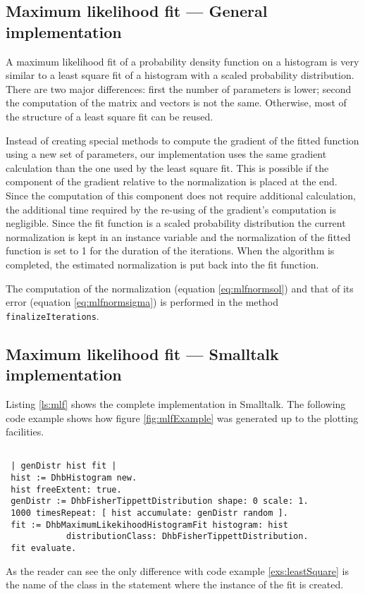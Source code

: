 \documentclass[twoside]{book}
\begin{document}
\subsection{Maximum likelihood fit --- General  implementation}
 A maximum likelihood fit
of a probability density function on a histogram is very similar
to a least square fit of a histogram with a scaled probability
distribution. There are two major differences: first the number of
parameters is lower; second the computation of the matrix and
vectors is not the same. Otherwise, most of the structure of a
least square fit can be reused.

Instead of creating special methods to compute the gradient of the
fitted function using a new set of parameters, our implementation
uses the same gradient calculation than the one used by the least
square fit. This is possible if the component of the gradient
relative to the normalization is placed at the end. Since the
computation of this component does not require additional
calculation, the additional time required by the re-using of the
gradient's computation is negligible. Since the fit function is a
scaled probability distribution the current normalization is kept
in an instance variable and the normalization of the fitted
function is set to 1 for the duration of the iterations. When the
algorithm is completed, the estimated normalization is put back
into the fit function.

The computation of the normalization (equation
\ref{eq:mlfnormsol}) and that of its error (equation
\ref{eq:mlfnormsigma}) is performed in the method {\tt
finalizeIterations}.

\subsection{Maximum likelihood fit --- Smalltalk  implementation}
\label{sec:smlfhist}Listing \ref{ls:mlf} shows the complete
implementation in Smalltalk. The following code example shows how
figure \ref{fig:mlfExample} was generated up to the plotting
facilities.
\begin{codeExample}
\begin{verbatim}

 | genDistr hist fit |
 hist := DhbHistogram new.
 hist freeExtent: true.
 genDistr := DhbFisherTippettDistribution shape: 0 scale: 1.
 1000 timesRepeat: [ hist accumulate: genDistr random ].
 fit := DhbMaximumLikekihoodHistogramFit histogram: hist
            distributionClass: DhbFisherTippettDistribution.
 fit evaluate.
\end{verbatim}
\end{codeExample}
As the reader can see the only difference with code example
\ref{exs:leastSquare} is the name of the class in the statement
where the instance of the fit is created.
\end{document}
